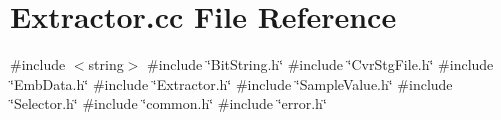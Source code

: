 \section{Extractor.\+cc File Reference}
\label{Extractor_8cc}
{\ttfamily \#include $<$string$>$}\newline
{\ttfamily \#include \char`\"{}Bit\+String.\+h\char`\"{}}\newline
{\ttfamily \#include \char`\"{}Cvr\+Stg\+File.\+h\char`\"{}}\newline
{\ttfamily \#include \char`\"{}Emb\+Data.\+h\char`\"{}}\newline
{\ttfamily \#include \char`\"{}Extractor.\+h\char`\"{}}\newline
{\ttfamily \#include \char`\"{}Sample\+Value.\+h\char`\"{}}\newline
{\ttfamily \#include \char`\"{}Selector.\+h\char`\"{}}\newline
{\ttfamily \#include \char`\"{}common.\+h\char`\"{}}\newline
{\ttfamily \#include \char`\"{}error.\+h\char`\"{}}\newline
